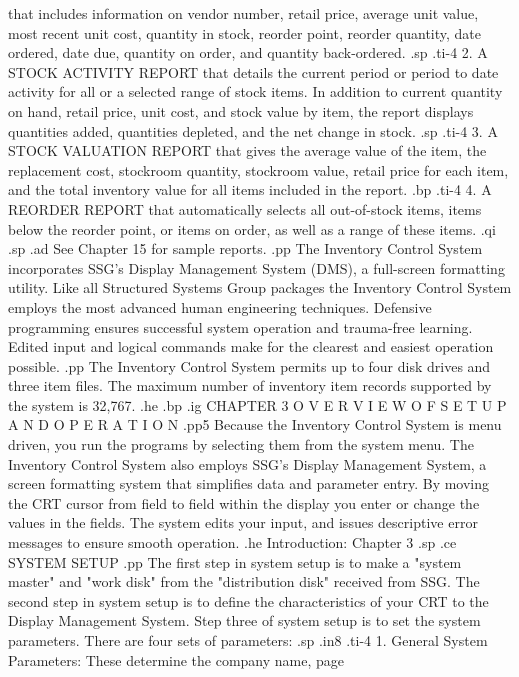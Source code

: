 that includes information on vendor number, retail price, average unit
value, most recent unit cost, quantity in stock, reorder point, reorder
quantity, date ordered, date due, quantity on order, and quantity back-ordered.
.sp
.ti-4
2.  A STOCK ACTIVITY REPORT that details the current period or period to date
activity for all or a selected range of stock items.  In addition to current
quantity on hand, retail price, unit cost, and stock value by item, the
report displays quantities added, quantities depleted, and the net change in
stock.
.sp
.ti-4
3.  A STOCK VALUATION REPORT that gives the average value of the item, the
replacement cost,
stockroom quantity, stockroom value, retail price for each item, and the
total inventory value for all items included in the report.
.bp
.ti-4
4.  A REORDER REPORT that automatically selects all out-of-stock items,
items below the reorder point, or items on order, as well as a range of
these items.
.qi
.sp
.ad
See Chapter 15 for sample reports.
.pp
The Inventory Control System incorporates SSG's Display Management System
(DMS), a full-screen formatting utility.  Like all Structured Systems Group
packages the Inventory Control System employs the most advanced human
engineering techniques.  Defensive programming ensures successful system
operation and trauma-free learning.  Edited input and logical commands
make for the clearest and easiest operation possible.
.pp
The Inventory Control System permits up to four disk drives and three item files.
The maximum number of inventory item records supported by the system is 32,767.
.he
.bp
.ig
CHAPTER 3
O V E R V I E W   O F	S E T U P   A N D   O P E R A T I O N
.pp5
Because the Inventory Control System is menu driven, you run the programs
by selecting them from the system menu.  The Inventory Control System also
employs SSG's Display Management System, a screen formatting system that
simplifies data and parameter entry. By moving the CRT cursor from field
to field within the display you enter or change the values in the fields.
The system edits your input, and issues descriptive error messages to ensure
smooth operation.
.he Introduction: Chapter 3
.sp
.ce
SYSTEM SETUP
.pp
The first step in system setup is to make a "system master" and "work disk"
from the "distribution disk" received from SSG.  The second step in system
setup is to define the characteristics of your CRT to the Display
Management System.  Step three of system setup is to set the system parameters.
There are four sets of parameters:
.sp
.in8
.ti-4
1.  General System Parameters:	These determine the company name, page
